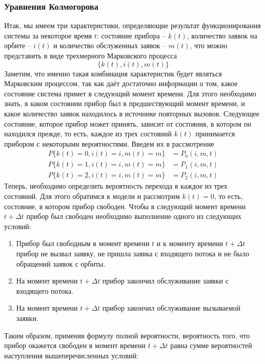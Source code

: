 \subsubsection{Уравнения Колмогорова}
Итак, мы имеем три характеристики, определяющие результат функционирования системы за некоторое время $t$: состояние прибора – $k(t)$, количество заявок на орбите – $i(t)$ и количество обслуженных заявок – $m(t)$, что можно представить в виде трехмерного Марковского процесса
\begin{equation*}
	\{k(t),i(t),m(t)\}
\end{equation*}
Заметим, что именно такая комбинация характеристик будет являться Марковским процессом, так как даёт достаточно информации о том, какое состояние система примет в следующий момент времени. Для этого необходимо знать, в каком состоянии прибор был в предшествующий момент времени, и какое количество заявок находилось в источнике повторных вызовов.
Следующее состояние, которое прибор может принять, зависит от состояния, в котором он находился прежде, то есть, каждое из трех состояний $k(t)$ принимается прибором с некоторыми вероятностями. Введем их в рассмотрение
\begin{equation*}
	\begin{split}
		P\{k(t)=0,i(t)=i,m(t)=m\} &=P_{0}(i,m,t)\\
		P\{k(t)=1,i(t)=i,m(t)=m\} &=P_{1}(i,m,t)\\
		P\{k(t)=2,i(t)=i,m(t)=m\} &=P_{2}(i,m,t)
	\end{split}
\end{equation*}
Теперь, необходимо определить вероятность перехода в каждое из трех состояний. Для этого обратимся к модели и рассмотрим $k(t) = 0$, то есть, состояние, в котором прибор свободен. Чтобы в следующий момент времени $t+\Delta t$ прибор был свободен необходимо выполнение одного из следующих условий:
\begin{enumerate}
	\item Прибор был свободным в момент времени $t$ и к моменту времени $t+\Delta t$  прибор не вызвал заявку, не пришла заявка с входящего потока и не было обращений заявок с орбиты.
	\item На момент времени $t+\Delta t$ прибор закончил обслуживание заявки с входящего потока.
	\item На момент времени $t+\Delta t$ прибор закончил обслуживание вызываемой заявки.
\end{enumerate}
Таким образом, применяя формулу полной вероятности, вероятность того, что прибор окажется свободен в момент времени $t+\Delta t$ равна сумме вероятностей наступления вышеперечисленных условий:

